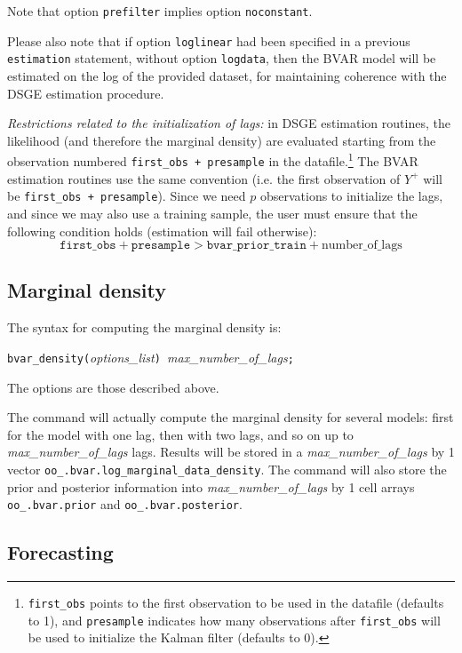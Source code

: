 \documentclass[11pt,a4paper]{article}
\begin{document}
Note that option \texttt{prefilter} implies option \texttt{noconstant}.

Please also note that if option \texttt{loglinear} had been specified in a previous \texttt{estimation} statement, without option \texttt{logdata}, then the BVAR model will be estimated on the log of the provided dataset, for maintaining coherence with the DSGE estimation procedure.

\emph{Restrictions related to the initialization of lags:} in DSGE estimation routines, the likelihood (and therefore the marginal density) are evaluated starting from the observation numbered \texttt{first\_obs + presample} in the datafile.\footnote{\texttt{first\_obs} points to the first observation to be used in the datafile (defaults to 1), and \texttt{presample} indicates how many observations after \texttt{first\_obs} will be used to initialize the Kalman filter (defaults to 0).} The BVAR estimation routines use the same convention (i.e. the first observation of $Y^+$ will be \texttt{first\_obs + presample}). Since we need $p$ observations to initialize the lags, and since we may also use a training sample, the user must ensure that the following condition holds (estimation will fail otherwise):
$$\texttt{first\_obs} + \texttt{presample} > \texttt{bvar\_prior\_train} + \text{number\_of\_lags}$$


\subsection{Marginal density}

The syntax for computing the marginal density is:

\medskip
\texttt{bvar\_density(}\textit{options\_list}\texttt{) }\textit{max\_number\_of\_lags}\texttt{;}
\medskip

The options are those described above.

The command will actually compute the marginal density for several models: first for the model with one lag, then with two lags, and so on up to \textit{max\_number\_of\_lags} lags. Results will be stored in a \textit{max\_number\_of\_lags} by 1 vector \texttt{oo\_.bvar.log\_marginal\_data\_density}. The command will also store the prior and posterior information into \textit{max\_number\_of\_lags} by 1 cell arrays \texttt{oo\_.bvar.prior} and \texttt{oo\_.bvar.posterior}.

\subsection{Forecasting}
\end{document}
